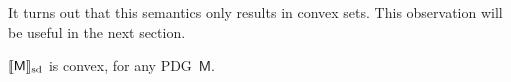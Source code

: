 \documentclass{article}
\newcommand\SD{_{\text{sd}}}
\newcommand{\bmu}{\boldsymbol{\mu}}
\newcommand{\Ed}{\mathcal E}
\newcommand{\sfM}{\mathsf M}
\newcommand{\MN}{PDG}
\newcommand{\MNs}{\MN s}
\numberwithin{equation}{section}
\begin{document}
\begin{notfocus}
{%






	
	

	It turns out that this semantics only results in convex sets. This observation will be useful in the next section.

	\begin{lemma}[restate=thmsetconvex] 
		\label{prop:convex}
		$\bbr{\sfM}\SD$ is convex, for any \MN\ $\sfM$.
	\end{lemma}%

}
\end{notfocus}
\end{document}
